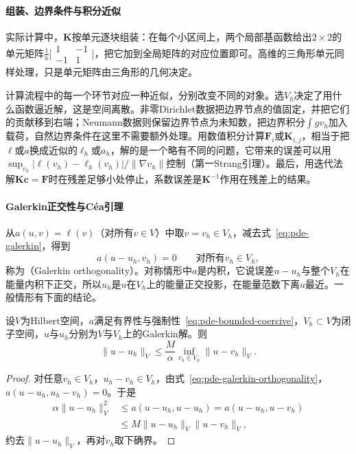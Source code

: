\paragraph{组装、边界条件与积分近似}
实际计算中，$\bm K$按单元逐块组装：在每个小区间上，两个局部基函数给出$2\times2$的单元矩阵$\tfrac1h\bigl[\begin{smallmatrix}1&-1\\-1&1\end{smallmatrix}\bigr]$，把它加到全局矩阵的对应位置即可。高维的三角形单元同样处理，只是单元矩阵由三角形的几何决定。

计算流程中的每一个环节对应一种近似，分别改变不同的对象。选$V_h$决定了用什么函数逼近解，这是空间离散。非零Dirichlet数据把边界节点的值固定，并把它们的贡献移到右端；Neumann数据则保留边界节点为未知数，把边界积分$\int g v_h$加入载荷，自然边界条件在这里不需要额外处理。用数值积分计算$\bm F_i$或$\bm K_{i,j}$，相当于把$\ell$或$a$换成近似的$\ell_h$或$a_h$，解的是一个略有不同的问题，它带来的误差可以用$\sup_{v_h}|\ell(v_h)-\ell_h(v_h)|/\|\nabla v_h\|$控制（第一Strang引理）。最后，用迭代法解$\bm K\bm c=\bm F$时在残差足够小处停止，系数误差是$\bm K^{-1}$作用在残差上的结果。

\paragraph{Galerkin正交性与Céa引理}
从$a(u,v)=\ell(v)$（对所有$v\in V$）中取$v=v_h\in V_h$，减去式~\eqref{eq:pde-galerkin}，得到
\begin{equation}
  a(u-u_h,v_h)=0\qquad\text{对所有}v_h\in V_h ,
  \label{eq:pde-galerkin-orthogonality}
\end{equation}
称为（Galerkin orthogonality）。对称情形中$a$是内积，它说误差$u-u_h$与整个$V_h$在能量内积下正交，所以$u_h$是$u$在$V_h$上的能量正交投影，在能量范数下离$u$最近。一般情形有下面的结论。

\begin{theorem}[Céa引理]
\label{thm:pde-cea}
设$V$为Hilbert空间，$a$满足有界性与强制性~\eqref{eq:pde-bounded-coercive}，$V_h\subset V$为闭子空间，$u$与$u_h$分别为$V$与$V_h$上的Galerkin解。则
\[
  \|u-u_h\|_V\leq\frac M\alpha\inf_{v_h\in V_h}\|u-v_h\|_V .
\]
\end{theorem}

\begin{proof}
对任意$v_h\in V_h$，$u_h-v_h\in V_h$，由式~\eqref{eq:pde-galerkin-orthogonality}，$a(u-u_h,u_h-v_h)=0$。于是
\[
  \begin{aligned}
    \alpha\|u-u_h\|_V^2&\leq a(u-u_h,u-u_h)=a(u-u_h,u-v_h)\\
    &\leq M\|u-u_h\|_V\|u-v_h\|_V ,
  \end{aligned}
\]
约去$\|u-u_h\|_V$，再对$v_h$取下确界。
\end{proof}

